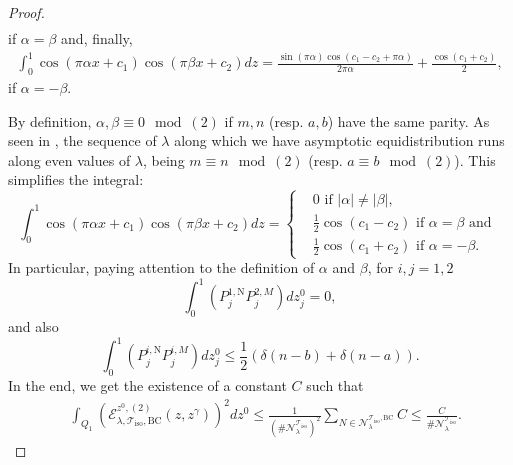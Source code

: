 \documentclass{amsart}
\theoremstyle{definition}
\theoremstyle{remark}
\renewcommand\leq\leqslant
\numberwithin{equation}{section}
\theoremstyle{definition}
\theoremstyle{remark}
\begin{document}
\begin{proof}
\begin{equation}
\begin{aligned}
		\end{aligned}
	\end{equation}if $\alpha=\beta$ and, finally, 
	\begin{equation}
		\begin{aligned}
			\int_0^1\cos\left(\pi \alpha x+c_1\right)\cos\left(\pi \beta x+c_2\right)dz=\frac{\sin\left(\pi \alpha\right)\cos\left(c_1-c_2+\pi \alpha\right)}{2\pi \alpha}+\frac{\cos\left(c_1+c_2\right)}{2},
		\end{aligned}
	\end{equation}if $\alpha=-\beta$.
	
	By definition, $\alpha,\beta\equiv 0\mod(2)$ if $m,n$ (resp. $a,b$) have the same parity. As seen in \cite{CillDisk}, the sequence of $\lambda$ along which we have asymptotic equidistribution runs along even values of $\lambda$, being $m\equiv n \mod(2)$ (resp. $a\equiv b\mod(2)$). This simplifies the integral:
	\begin{equation}
		\int_0^1\cos\left(\pi \alpha x+c_1\right)\cos\left(\pi \beta x+c_2\right)dz=\left\{\begin{aligned}
			&0\text{ if }|\alpha|\neq|\beta|,\\
			&\frac{1}{2}\cos\left(c_1-c_2\right)\text{ if }\alpha=\beta\text{ and }\\
			&\frac{1}{2}\cos\left(c_1+c_2\right)\text{ if }\alpha=-\beta.
		\end{aligned}\right.
	\end{equation}
	In particular, paying attention to the definition of $\alpha$ and $\beta$, for $i,j=1,2$ \begin{equation}
		\int_{0}^{1}\left(P_j^{1,\mathrm{N}}P_j^{2,M}\right)dz_j^0=0,
	\end{equation}and also \begin{equation}
		\int_{0}^{1}\left(P_j^{i,\mathrm{N}}P_j^{i,M}\right)dz_j^0\leq \frac{1}{2}\left(\delta(n-b)+\delta(n-a)\right).
	\end{equation}In the end, we get the existence of a constant $C$ such that	\begin{equation}
		\begin{aligned}
			&\int_{Q_1}\left(\mathcal{E}_{\lambda,\mathcal{T}_\mathrm{iso},\mathrm{BC}}^{z^0,(2)}(z,z^\gamma)\right)^2dz^0\leq \frac{1}{\left(\#\mathcal{N}_\lambda^{\mathcal{T}_\mathrm{iso}}\right)^2}\sum_{N\in\mathcal{N}_\lambda^{\mathcal{T}_\mathrm{iso},\mathrm{BC}}}C\leq\frac{C}{\#\mathcal{N}_\lambda^{\mathcal{T}_\mathrm{iso}}}.
		\end{aligned}
	\end{equation}

\end{proof}
\end{document}

